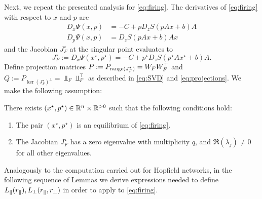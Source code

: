 \documentclass[letterpaper, 10 pt, conference]{ieeeconf}
\begin{document}
Next, we repeat the presented analysis for \eqref{eq:firing}.
The derivatives of \eqref{eq:firing} with respect to \(x\) and \(p\) are
\begin{subequations}
    \begin{align}
        D_{x}\Psi(x,p) & = -C + pD_{z}S(pAx + b)A \label{eq:firing-D_x} \\
        D_{p}\Psi(x,p) & = D_{z}S(pAx + b)Ax \label{eq:firing-D_p}
    \end{align} \label{eq:firing-jacobians}
\end{subequations}
and the Jacobian \(J^{\star}_F\) at the singular point evaluates to
\begin{equation*}
    J^{\star}_F := D_{x}\Psi(x^{\star},p^{\star}) = -C + p^{\star} D_{z}S(p^{\star} A x^{\star} + b)A.
\end{equation*}
%
Define projection matrices \(P:=P_{\range(J^{\star}_F)}=W_F W_F^{\top}\) and \(Q:=P_{\ker(J^{\star}_F)^{\perp}}=\Vbar_F \Vbar_F^{\top}\) as described in \eqref{eq:SVD} and \eqref{eq:projections}.  We make the following assumption:
\begin{assumption}\label{asmp:firing}
    There exists \((x^{\star},p^{\star}) \in \R[n] \times \R[>0]\) such that the following conditions hold:
    \begin{enumerate}[label=(\roman*)]
        \item The pair \((x^{\star},p^{\star})\) is an equilibrium of \eqref{eq:firing}.
        \item The Jacobian \(J^{\star}_F\) has a zero eigenvalue with multiplicity \(q\), and \(\Re(\lambda_{j}) \neq 0\) for all other eigenvalues.
    \end{enumerate}
\end{assumption}
Analogously to the computation carried out for Hopfield networks, in the following sequence of Lemmas we derive expressions needed to define \(\Lpr,\Lpp\) in order to apply  to \eqref{eq:firing}.

\vspace{3mm}
\end{document}
